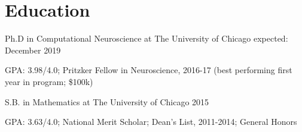 \documentclass[]{friggeri-cv} %
\begin{document}

\contactheader%

\section{Education}
\begin{entrylist}

\entry
{Ph.D {\normalfont in Computational Neuroscience at The University of Chicago}}
{expected: December 2019}
{\item[] GPA: 3.98/4.0; Pritzker Fellow in Neuroscience, 2016-17 (best performing first year in program; \$100k)}
\entry
{S.B. {\normalfont in Mathematics at The University of Chicago}}
{2015}
{\item[] GPA: 3.63/4.0; National Merit Scholar; Dean's List, 2011-2014; General Honors}

\end{entrylist}

\end{document}
